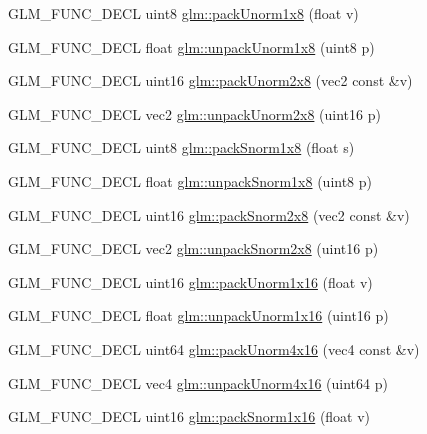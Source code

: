 \begin{DoxyCompactItemize}
\item 
G\-L\-M\-\_\-\-F\-U\-N\-C\-\_\-\-D\-E\-C\-L uint8 \hyperlink{group__gtc__packing_ga2f9963e5d762b10085b280d3662017ba}{glm\-::pack\-Unorm1x8} (float v)
\item 
G\-L\-M\-\_\-\-F\-U\-N\-C\-\_\-\-D\-E\-C\-L float \hyperlink{group__gtc__packing_ga32f3f2642df2ea87449d59fb614a8305}{glm\-::unpack\-Unorm1x8} (uint8 p)
\item 
G\-L\-M\-\_\-\-F\-U\-N\-C\-\_\-\-D\-E\-C\-L uint16 \hyperlink{group__gtc__packing_ga833288fc0d4a79f19d0db75a6843bfe6}{glm\-::pack\-Unorm2x8} (vec2 const \&v)
\item 
G\-L\-M\-\_\-\-F\-U\-N\-C\-\_\-\-D\-E\-C\-L vec2 \hyperlink{group__gtc__packing_ga96ce0c24339ee676e28a027fffd1edf6}{glm\-::unpack\-Unorm2x8} (uint16 p)
\item 
G\-L\-M\-\_\-\-F\-U\-N\-C\-\_\-\-D\-E\-C\-L uint8 \hyperlink{group__gtc__packing_ga26b6cd7a35c46c4b6a342f3b97b47423}{glm\-::pack\-Snorm1x8} (float s)
\item 
G\-L\-M\-\_\-\-F\-U\-N\-C\-\_\-\-D\-E\-C\-L float \hyperlink{group__gtc__packing_ga6f2bebf536fbf7c8b97d4b306bb3354e}{glm\-::unpack\-Snorm1x8} (uint8 p)
\item 
G\-L\-M\-\_\-\-F\-U\-N\-C\-\_\-\-D\-E\-C\-L uint16 \hyperlink{group__gtc__packing_ga05d08a82923166ec7cd5d0e6154c9953}{glm\-::pack\-Snorm2x8} (vec2 const \&v)
\item 
G\-L\-M\-\_\-\-F\-U\-N\-C\-\_\-\-D\-E\-C\-L vec2 \hyperlink{group__gtc__packing_ga27f30f0281b88e152b0895f5e2ead878}{glm\-::unpack\-Snorm2x8} (uint16 p)
\item 
G\-L\-M\-\_\-\-F\-U\-N\-C\-\_\-\-D\-E\-C\-L uint16 \hyperlink{group__gtc__packing_ga60c7d915f5653559ae02c2f79a8c5c1d}{glm\-::pack\-Unorm1x16} (float v)
\item 
G\-L\-M\-\_\-\-F\-U\-N\-C\-\_\-\-D\-E\-C\-L float \hyperlink{group__gtc__packing_ga7770e3ade4f4764cc1b2eb42ac4ec188}{glm\-::unpack\-Unorm1x16} (uint16 p)
\item 
G\-L\-M\-\_\-\-F\-U\-N\-C\-\_\-\-D\-E\-C\-L uint64 \hyperlink{group__gtc__packing_gac561f06c908b7302537a8ef29fcb409e}{glm\-::pack\-Unorm4x16} (vec4 const \&v)
\item 
G\-L\-M\-\_\-\-F\-U\-N\-C\-\_\-\-D\-E\-C\-L vec4 \hyperlink{group__gtc__packing_gafb2b502bc406031a5618ce930139a9e3}{glm\-::unpack\-Unorm4x16} (uint64 p)
\item 
G\-L\-M\-\_\-\-F\-U\-N\-C\-\_\-\-D\-E\-C\-L uint16 \hyperlink{group__gtc__packing_gac29411d6c0f6ed0fe9f0396dfe92e0e8}{glm\-::pack\-Snorm1x16} (float v)

\end{DoxyCompactItemize}

